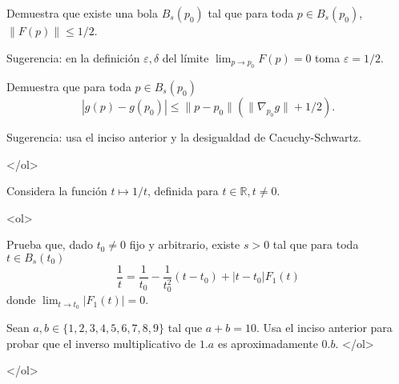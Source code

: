 \documentclass{article}
\theoremstyle{definition}
\begin{document}
            \item Demuestra que existe una bola $B_s(p_0)$ tal que para toda $p\in B_s(p_0)$,
              $\|F(p)\|\leq 1/2$.

              Sugerencia: en la definición $\varepsilon,\delta$ del límite $\lim_{p\to p_0}F(p)=0$
              toma $\varepsilon =1/2$.
              
            \item Demuestra que  para toda $p\in B_s(p_0)$
              $$
              |g(p)-g(p_0)|\leq \|p-p_0\| (\|\nabla_{p_0}g\|+1/2).
              $$

              Sugerencia: usa el inciso anterior y la desigualdad de Cacuchy-Schwartz.
              
            </ol>

            \item  Considera la función  $t\mapsto 1/t$, definida para $t\in \mathbb{R}, t\ne 0$.

              <ol>
                \item Prueba que,  dado $t_0\ne 0$ fijo y arbitrario, existe $s>0$ tal que para toda $t\in B_s(t_0)$  
              $$
              \frac{1}{t}=\frac{1}{t_0}-\frac{1}{t_0^2}(t-t_0)+|t-t_0|F_1(t)
              $$
              donde $\lim_{t\to t_0} |F_1(t)| =0$.
            \item Sean $a,b\in \{1,2,3,4,5,6,7,8,9\}$ tal que $a+b=10$. Usa el inciso anterior para
              probar que el inverso multiplicativo de $1.a$ es aproximadamente $0.b$.
            </ol>
            
          

         
            
</ol>


  
       
\end{document}
